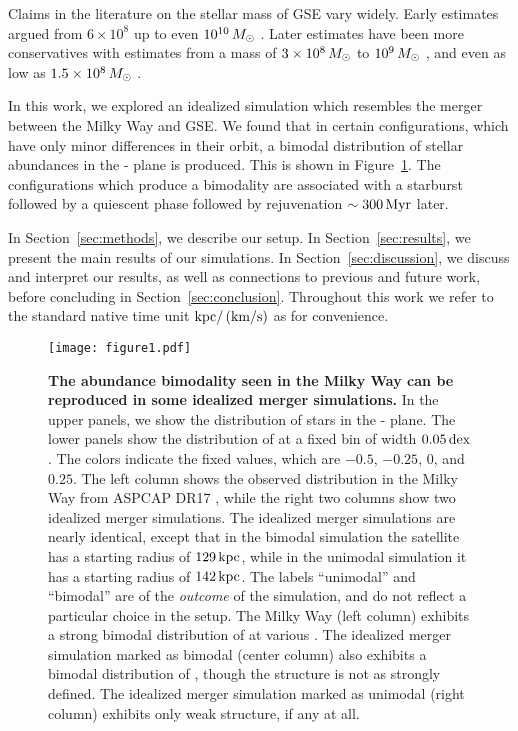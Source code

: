 Claims in the literature on the stellar mass of GSE vary widely. Early estimates argued from $6\times10^8$ up to even $10^{10}\,M_{\odot}$ \citep{2018MNRAS.478..611B,2018Natur.563...85H,2019MNRAS.484.4471F,2019MNRAS.487L..47V,2019MNRAS.488.1235M,2020MNRAS.493.5195D,2020MNRAS.497..109F}. Later estimates have been more conservatives with estimates from a mass of $3\times10^8\,M_{\odot}$ to $10^9\,M_{\odot}$ \citep{2019MNRAS.482.3426M,2020MNRAS.492.3631M,2021ApJ...923...92N,2022AJ....164..249H}, and even as low as $1.5\times10^8\,M_{\odot}$ \citep{2023MNRAS.526.1209L}.

In this work, we explored an idealized simulation which resembles the merger between the Milky Way and GSE. We found that in certain configurations, which have only minor differences in their orbit, a bimodal distribution of stellar abundances in the \alphaFe{}-\FeH{} plane is produced. This is shown in Figure~\ref{fig:fig1}. The configurations which produce a bimodality are associated with a starburst followed by a quiescent phase followed by rejuvenation $\sim300\,\textrm{Myr}$ later.

In Section~\ref{sec:methods}, we describe our setup. In Section~\ref{sec:results}, we present the main results of our simulations. In Section~\ref{sec:discussion}, we discuss and interpret our results, as well as connections to previous and future work, before concluding in Section~\ref{sec:conclusion}. Throughout this work we refer to the standard native time unit $\textrm{kpc}/\left(\textrm{km}/\textrm{s}\right)$ as \Gyr{} for convenience.

\begin{figure*}
  \centering
  \texttt{[image: figure1.pdf]}
  \caption{\textbf{The abundance bimodality seen in the Milky Way can be reproduced in some idealized merger simulations.} In the upper panels, we show the distribution of stars in the \MgFe{}-\FeH{} plane. The lower panels show the distribution of \MgFe{} at a fixed \FeH{} bin of width $0.05\,\textrm{dex}$. The colors indicate the fixed \FeH values, which are $-0.5$, $-0.25$, $0$, and $0.25$. The left column shows the observed distribution in the Milky Way from ASPCAP DR17 \citep[][J.A.~Holtzman et al., in preparation]{2016AJ....151..144G}, while the right two columns show two idealized merger simulations. The idealized merger simulations are nearly identical, except that in the bimodal simulation the satellite has a starting radius of $129\,\textrm{kpc}$, while in the unimodal simulation it has a starting radius of $142\,\textrm{kpc}$. The labels ``unimodal'' and ``bimodal'' are of the \textit{outcome} of the simulation, and do not reflect a particular choice in the setup. The Milky Way (left column) exhibits a strong bimodal distribution of \MgFe{} at various \FeH{}. The idealized merger simulation marked as bimodal (center column) also exhibits a bimodal distribution of \MgFe{}, though the structure is not as strongly defined. The idealized merger simulation marked as unimodal (right column) exhibits only weak structure, if any at all.}
  \label{fig:fig1}
\end{figure*}